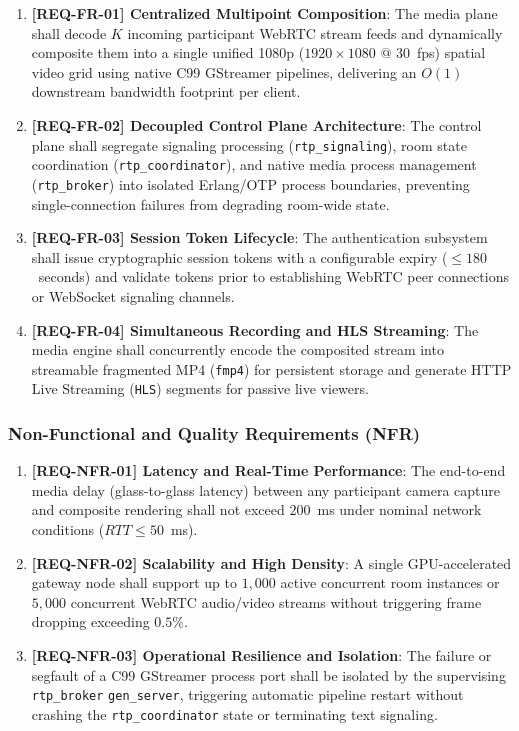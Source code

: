 \documentclass{article}
\begin{document}
\begin{enumerate}
    \item \textbf{[REQ-FR-01] Centralized Multipoint Composition}: 
          The media plane shall decode $K$ incoming participant WebRTC stream feeds and dynamically composite them into a single unified 1080p ($1920 \times 1080$ @ 30~fps) spatial video grid using native C99 GStreamer pipelines, delivering an $O(1)$ downstream bandwidth footprint per client.
    \item \textbf{[REQ-FR-02] Decoupled Control Plane Architecture}: 
          The control plane shall segregate signaling processing (\texttt{rtp\_signaling}), room state coordination (\texttt{rtp\_coordinator}), and native media process management (\texttt{rtp\_broker}) into isolated Erlang/OTP process boundaries, preventing single-connection failures from degrading room-wide state.
    \item \textbf{[REQ-FR-03] Session Token Lifecycle}: 
          The authentication subsystem shall issue cryptographic session tokens with a configurable expiry ($\le 180$~seconds) and validate tokens prior to establishing WebRTC peer connections or WebSocket signaling channels.
    \item \textbf{[REQ-FR-04] Simultaneous Recording and HLS Streaming}: 
          The media engine shall concurrently encode the composited stream into streamable fragmented MP4 (\texttt{fmp4}) for persistent storage and generate HTTP Live Streaming (\texttt{HLS}) segments for passive live viewers.
\end{enumerate}

\subsubsection{Non-Functional and Quality Requirements (NFR)}

\begin{enumerate}
    \item \textbf{[REQ-NFR-01] Latency and Real-Time Performance}: 
          The end-to-end media delay (glass-to-glass latency) between any participant camera capture and composite rendering shall not exceed $200$~ms under nominal network conditions ($RTT \le 50$~ms).
    \item \textbf{[REQ-NFR-02] Scalability and High Density}: 
          A single GPU-accelerated gateway node shall support up to $1,000$ active concurrent room instances or $5,000$ concurrent WebRTC audio/video streams without triggering frame dropping exceeding $0.5\%$.
    \item \textbf{[REQ-NFR-03] Operational Resilience and Isolation}: 
          The failure or segfault of a C99 GStreamer process port shall be isolated by the supervising \texttt{rtp\_broker} \texttt{gen\_server}, triggering automatic pipeline restart without crashing the \texttt{rtp\_coordinator} state or terminating text signaling.
\end{enumerate}
\end{document}

